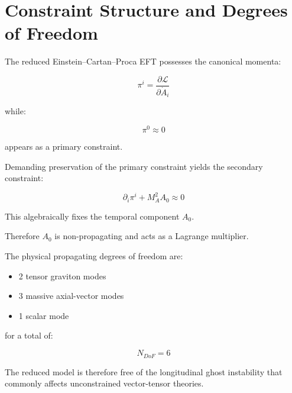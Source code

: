 \section{Constraint Structure and Degrees of Freedom}

The reduced Einstein--Cartan--Proca EFT possesses the canonical momenta:

\begin{equation}
\pi^i = \frac{\partial \mathcal L}{\partial \dot A_i}
\end{equation}

while:

\begin{equation}
\pi^0 \approx 0
\end{equation}

appears as a primary constraint.

Demanding preservation of the primary constraint yields the secondary constraint:

\begin{equation}
\partial_i \pi^i + M_A^2 A_0 \approx 0
\end{equation}

This algebraically fixes the temporal component \(A_0\).

Therefore \(A_0\) is non-propagating and acts as a Lagrange multiplier.

The physical propagating degrees of freedom are:

\begin{itemize}
\item 2 tensor graviton modes
\item 3 massive axial-vector modes
\item 1 scalar mode
\end{itemize}

for a total of:

\begin{equation}
N_{DoF} = 6
\end{equation}

The reduced model is therefore free of the longitudinal ghost instability that commonly affects unconstrained vector-tensor theories.
